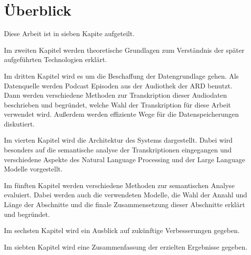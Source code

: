 \section{Überblick}

Diese Arbeit ist in sieben Kapite aufgeteilt.

Im zweiten Kapitel werden theoretische Grundlagen zum Verständnis der später aufgeführten Technologien erklärt.

Im dritten Kapitel wird es um die Beschaffung der Datengrundlage gehen. 
Als Datenquelle werden Podcast Episoden aus der Audiothek der ARD benutzt. 
Dann werden verschiedene Methoden zur Transkription dieser Audiodaten beschrieben und begründet, welche Wahl der Transkription für diese Arbeit verwendet wird.
Außerdem werden effiziente Wege für die Datenspeicherungen diskutiert.

Im vierten Kapitel wird die Architektur des Systems dargestellt. 
Dabei wird besonders auf die semantische analyse der Transkriptionen eingegangen und verschiedene Aspekte des Natural Language Processing und der Large Language Modelle vorgestellt.

Im fünften Kapitel werden verschiedene Methoden zur semantischen Analyse evaluiert.
Dabei werden auch die verwendeten Modelle, die Wahl der Anzahl und Länge der Abschnitte und die finale Zusammensetzung dieser Abschnitte erklärt und begründet.

Im sechsten Kapitel wird ein Ausblick auf zukünftige Verbesserungen gegeben.

Im siebten Kapitel wird eine Zusammenfassung der erzielten Ergebnisse gegeben.
